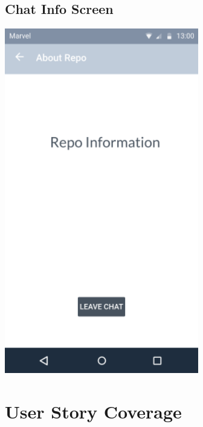 \documentclass{report}
\begin{document}
\subsection{Chat Info Screen}
\begin{center}
    \includegraphics[scale=0.6]{design-chat-info}
\end{center}

\newpage
\section{User Story Coverage}
\end{document}

